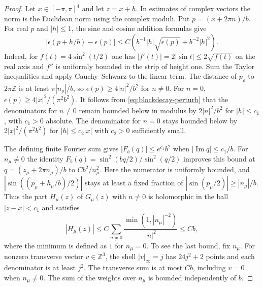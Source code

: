 \begin{proof}
Let $x\in[-\pi,\pi]^4$ and let $z=x+h$. In estimates of complex vectors the
norm is the Euclidean norm using the complex moduli. Put $p=(x+2\pi n)/b$.
For real $p$ and $|h|\le 1$, the sine and cosine addition formulas give
\begin{equation}\label{eq:blockdecay-perturb}
 |\epsilon(p+h/b)-\epsilon(p)|
 \le C\left(b^{-1}|h|\sqrt{\epsilon(p)}+b^{-2}|h|^2\right).
\end{equation}
Indeed, for $f(t)=4\sin^2(t/2)$ one has $|f'(t)|=2|\sin t|\le2\sqrt{f(t)}$
on the real axis and $f''$ is uniformly bounded in the strip of height one.
Sum the Taylor inequalities and apply Cauchy--Schwarz to the linear term.
The distance of $p_\rho$ to $2\pi\mathbb Z$ is at least
$\pi |n_\rho|/b$, so $\epsilon(p)\ge4|n|^2/b^2$ for $n\ne0$.
For $n=0$, $\epsilon(p)\ge 4|x|^2/(\pi^2b^2)$.
It follows from \eqref{eq:blockdecay-perturb} that the denominators for $n\ne0$ remain
bounded below in modulus by $2|n|^2/b^2$ for $|h|\le c_1$, with $c_1>0$
absolute. The denominator for $n=0$ stays bounded below by
$2|x|^2/(\pi^2b^2)$ for $|h|\le c_2|x|$ with $c_2>0$ sufficiently small.

The defining finite Fourier sum gives $|F_b(q)|\le e^{c_1}b^2$ when
$|\operatorname{Im}q|\le c_1/b$. For $n_\mu\ne0$ the identity
$F_b(q)=\sin^2(bq/2)/\sin^2(q/2)$ improves this bound at
$q=(z_\mu+2\pi n_\mu)/b$ to $Cb^2/n_\mu^2$. Here the numerator is uniformly
bounded, and $|\sin((p_\mu+h_\mu/b)/2)|$ stays at least a fixed fraction of
$|\sin(p_\mu/2)|\ge |n_\mu|/b$. Thus the part $H_\mu(z)$ of $G_\mu(z)$
with $n\ne0$ is holomorphic in the ball $|z-x|<c_1$ and satisfies
\begin{equation}\label{eq:blockdecay-alias}
 |H_\mu(z)|\le C\sum_{n\ne0}\frac{\min(1,|n_\mu|^{-2})}{|n|^2}\le Cb,
\end{equation}
where the minimum is defined as $1$ for $n_\mu=0$. To see the last bound,
fix $n_\mu$. For nonzero transverse vector $v\in\mathbb Z^3$, the shell
$|v|_\infty=j$ has $24j^2+2$ points and each denominator is at least $j^2$.
The transverse sum is at most $Cb$, including $v=0$ when $n_\mu\ne0$.
The sum of the weights over $n_\mu$ is bounded independently of $b$.


\end{proof}
